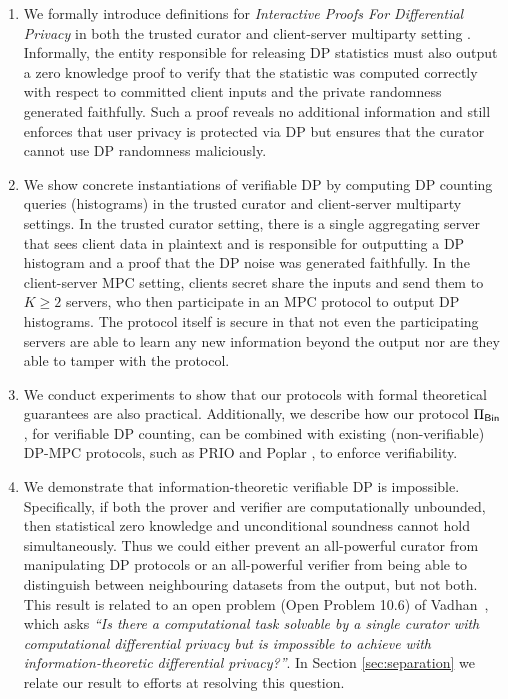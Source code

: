 \begin{enumerate}

\item{We formally introduce definitions for
    \textit{Interactive Proofs For Differential Privacy} in
    both the trusted curator and client-server multiparty setting
    \cite{baum2014publicly}. Informally, the entity responsible for
    releasing DP statistics must also output a
    zero knowledge proof to verify that the statistic was computed
    correctly with respect to committed client inputs and the private randomness generated faithfully. Such a
    proof reveals no additional information and still enforces that
    user privacy is protected via DP but ensures that the curator
    cannot use DP randomness maliciously.}

\item{We show concrete instantiations of verifiable DP by computing DP
    counting queries (histograms) in the trusted curator and
    client-server multiparty settings. In the trusted curator
    setting, there is a single aggregating server that sees client
    data in plaintext and is responsible for outputting a DP histogram
    and a proof that the DP noise was generated faithfully. In the
    client-server MPC setting, clients secret share the inputs and
    send them to $K \geq 2$ servers, who then participate in an MPC
    protocol to output DP histograms. The protocol itself is secure in
    that not even the participating servers are able to learn any new
    information beyond the output nor are they able to tamper with the
    protocol.}
    
\item{We conduct experiments to show that our protocols with formal
    theoretical guarantees are also practical.  Additionally, we
    describe how our protocol $\Pi_{\mathsf{Bin}}$, for verifiable DP counting,
    can be combined with existing (non-verifiable) DP-MPC protocols,
    such as PRIO \cite{corrigan-gibbs_prio_2017} and Poplar
    \cite{boneh_lightweight_2022}, to enforce verifiability.}
	

\item{We demonstrate that information-theoretic verifiable DP is
    impossible. Specifically, if both the prover and verifier are
    computationally unbounded, then statistical zero knowledge
    and unconditional soundness cannot hold simultaneously. Thus we could either
    prevent an all-powerful curator from manipulating DP protocols or
    an all-powerful verifier from being able to distinguish between
    neighbouring datasets from the output, but not both.  This result
    is related to an open problem (Open Problem 10.6) of
    Vadhan~\cite{vadhan2017complexity}, which asks \textit{``Is there
      a computational task solvable by a single curator with
      computational differential privacy but is impossible to achieve
      with information-theoretic differential privacy?''}.  In Section
    \ref{sec:separation} we relate our result to efforts at resolving
    this question.}

\end{enumerate}

